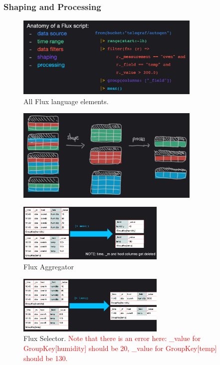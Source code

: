 \documentclass[10pt,a4paper]{article}
\begin{document}
 \subsubsection{Shaping and Processing}
     \begin{figure}[ht!]
 \hfill \includegraphics[width=250pt]{images/flux-elements}
 \hspace*{\fill}
 \caption{All Flux language elements.}
 \end{figure} 
      \begin{figure}[ht!]
 \hfill \includegraphics[width=250pt]{images/flux-shape-process}
 \hspace*{\fill}
 \end{figure} 
 \pagebreak
      \begin{figure}[ht!]
 \hfill \includegraphics[width=200pt]{images/flux-aggregator}
 \hspace*{\fill}
 \caption{Flux Aggregator}
 \end{figure} 
      \begin{figure}[ht!]
 \hfill \includegraphics[width=200pt]{images/flux-selector}
 \hspace*{\fill}
 \caption{Flux Selector. \textcolor{red}{Note that there is an error here: \_value for GroupKey[humidity] should be 20, \_value for GroupKey[temp] should be 130.}}
 \end{figure} 
 
\end{document}
